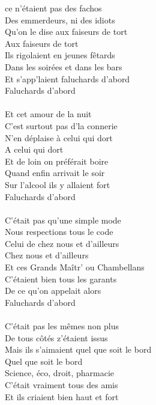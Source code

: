 
 ce n'étaient pas des fachos
\\Des emmerdeurs, ni des idiots
\\Qu'on le dise aux faiseurs de tort
\\Aux faiseurs de tort
\\Ils rigolaient en jeunes fêtards
\\Dans les soirées et dans les bars
\\Et s'app'laient faluchards d'abord
\\Faluchards d'abord
\\\\Et cet amour de la nuit
\\C'est surtout pas d'la connerie
\\N'en déplaise à celui qui dort
\\A celui qui dort
\\Et de loin on préférait boire
\\Quand enfin arrivait le soir
\\Sur l'alcool ils y allaient fort
\\Faluchards d'abord
\\\\C'était pas qu'une simple mode
\\Nous respections tous le code
\\Celui de chez nous et d'ailleurs
\\Chez nous et d'ailleurs
\\Et ces Grands Maîtr' ou Chambellans
\\C'étaient bien tous les garants
\\De ce qu'on appelait alors
\\Faluchards d'abord
\\\\C'était pas les mêmes non plus
\\De tous côtés z'étaient issus
\\Mais ils s'aimaient quel que soit le bord
\\Quel que soit le bord
\\Science, éco, droit, pharmacie
\\C'était vraiment tous des amis
\\Et ils criaient bien haut et fort
